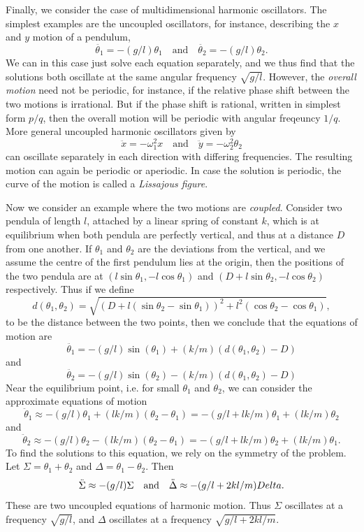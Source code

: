 Finally, we consider the case of multidimensional harmonic oscillators. The simplest examples are the uncoupled oscillators, for instance, describing the $x$ and $y$ motion of a pendulum,
%
\[ \ddot{\theta_1} = - (g/l) \theta_1 \quad\text{and}\quad \ddot{\theta_2} = - (g/l) \theta_2. \]
%
We can in this case just solve each equation separately, and we thus find that the solutions both oscillate at the same angular frequency $\sqrt{g/l}$. However, the \emph{overall motion} need not be periodic, for instance, if the relative phase shift between the two motions is irrational. But if the phase shift is rational, written in simplest form $p/q$, then the overall motion will be periodic with angular freqeuncy $1/q$. More general uncoupled harmonic oscillators given by
%
\[ \ddot{x} = - \omega_1^2 x \quad\text{and}\quad \ddot{y} = - \omega_2^2 \theta_2 \]
%
can oscillate separately in each direction with differing frequencies. The resulting motion can again be periodic or aperiodic. In case the solution is periodic, the curve of the motion is called a \emph{Lissajous figure}.

Now we consider an example where the two motions are \emph{coupled}. Consider two pendula of length $l$, attached by a linear spring of constant $k$, which is at equilibrium when both pendula are perfectly vertical, and thus at a distance $D$ from one another. If $\theta_1$ and $\theta_2$ are the deviations from the vertical, and we assume the centre of the first pendulum lies at the origin, then the positions of the two pendula are at $(l \sin \theta_1, - l \cos \theta_1)$ and $(D + l \sin \theta_2, - l \cos \theta_2)$ respectively. Thus if we define
%
\[ d(\theta_1,\theta_2) = \sqrt{ (D + l (\sin \theta_2 - \sin \theta_1))^2 + l^2 (\cos \theta_2 - \cos \theta_1) }, \]
%
to be the distance between the two points, then we conclude that the equations of motion are
%
\[ \ddot{\theta_1} = - (g/l) \sin(\theta_1) + (k/m) (d(\theta_1, \theta_2) - D) \]
%
and
%
\[ \ddot{\theta_2} = - (g/l) \sin(\theta_2) - (k/m) (d(\theta_1,\theta_2) - D) \]
%
Near the equilibrium point, i.e. for small $\theta_1$ and $\theta_2$, we can consider the approximate equations of motion
%
\[ \ddot{\theta}_1 \approx - (g/l) \theta_1 + (l k/m) (\theta_2 - \theta_1) = - (g/l + l k/m) \theta_1 + (l k/m) \theta_2 \]
%
and
%
\[ \ddot{\theta}_2 \approx - (g/l) \theta_2 - (l k/m) (\theta_2 - \theta_1) = - (g/l + l k/m) \theta_2 + (l k/m) \theta_1. \]
%
To find the solutions to this equation, we rely on the symmetry of the problem. Let $\Sigma = \theta_1 + \theta_2$ and $\Delta = \theta_1 - \theta_2$. Then
%
\[ \ddot{\Sigma} \approx -(g/l) \Sigma \quad\text{and}\quad \ddot{\Delta} \approx -(g/l + 2k l /m) \\Delta. \]
%
These are two uncoupled equations of harmonic motion. Thus $\Sigma$ oscillates at a frequency $\sqrt{g/l}$, and $\Delta$ oscillates at a frequency $\sqrt{g/l + 2k l /m}$.

